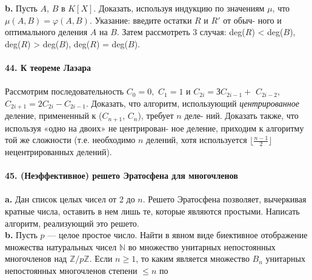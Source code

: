 \noindent\hspace*{10pt}\textbf{b.} Пусть $A$, $B$ в $K[X]$. Доказать, используя индукцию по значениям\linebreak
$\mu$, что $\mu(A ,B ) = \varphi(A, B)$. Указание: введите остатки $R$ и $R'$ от обыч-\linebreak
ного и оптимального деления $A$ на $B$. Затем рассмотреть 3 случая:\linebreak
deg($R$) < deg($B$), deg($R$) > deg($B$), deg($R$) = deg($B$).
\\
\\
\noindent\textbf{44. К теореме Лаэара}\\\\
\hspace*{10pt} Рассмотрим последовательность $C_0 = 0,$ $ C_1 = 1$ и $C_{2i} = ЗC_{2i-1} +$\linebreak
$C_{2i-2},$ $C_{2i+1}=2C_{2i}-C_{2i-1}$. Доказать, что алгоритм, использующий\linebreak
\textit{центрированное} деление, примененный к ($C_{n+1}$, $C_n$), требует $n$ деле-\linebreak
ний. Доказать также, что используя «одно на двоих» не центрирован-\linebreak
ное деление, приходим к алгоритму той же сложности (т.е. необходимо\linebreak
$n$ делений, хотя используется $\lfloor\frac{n-1}{2}\rfloor$ нецентрированных делений).
\\
\\
\noindent\textbf{45. (Неэффективное) решето Эратосфена для многочленов}\\\\
\hspace*{10pt}\textbf{a.} Дан список целых чисел от 2 до $n$. Решето Эратосфена позволяет,\linebreak
вычеркивая кратные числа, оставить в нем лишь те, которые являются\linebreak
простыми. Написать алгоритм, реализующий это решето.\\
\hspace*{10pt}\textbf{b.}  Пусть $p$ — целое простое число. Найти в явном виде биективное\linebreak
отображение множества натуральных чисел $\mathbb{N}$ во множество унитарных\linebreak
непостоянных многочленов над $\mathbb{Z}/p\mathbb{Z}$. Если $n\geq 1$, то каким является\linebreak
множество $B_n$ унитарных непостоянных многочленов степени $\leq n$ по\linebreak

